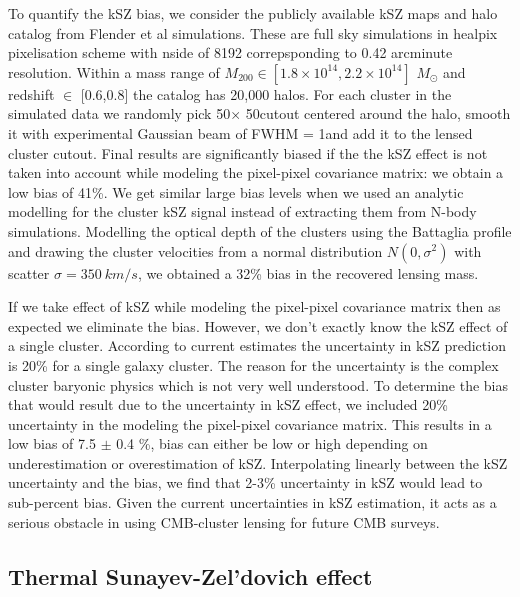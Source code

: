 To quantify the kSZ bias, we consider the publicly available kSZ maps and halo catalog from Flender et al simulations.
These are full sky simulations in healpix pixelisation scheme with nside of 8192 correpsponding to 0.42 arcminute resolution.
Within a mass range of $M_{200} \in [1.8 \times 10^{14},2.2 \times 10^{14}]$ $M_{\odot}$ and redshift $\in$ [0.6,0.8] the catalog has 20,000 halos. 
For each cluster in the simulated data we randomly pick 50\am $\times$ 50\am cutout centered around the halo, smooth it with experimental Gaussian beam of FWHM = 1\am and add it to the lensed cluster cutout. 
Final results are significantly biased if the the kSZ effect is not taken into account while modeling the pixel-pixel covariance matrix: we obtain a low bias of 41\%.
We get similar large bias levels when we used an analytic modelling for the cluster kSZ signal instead of extracting them from N-body simulations. Modelling the optical depth of the clusters using the Battaglia \cite{nickb2016} profile and drawing the cluster velocities from a normal distribution $N(0, \sigma^{2})$ with scatter $\sigma = 350\ km/s$, we obtained a 32\% bias in the recovered lensing mass.
  
 If we take effect of kSZ while modeling the pixel-pixel covariance matrix then as expected we eliminate the bias. 
 However, we don't exactly know the kSZ effect of a single cluster. According to current estimates the uncertainty in kSZ prediction is 20\% for a single galaxy cluster. 
 The reason for the uncertainty is the complex cluster baryonic physics which is not very well understood. 
 To determine the bias that would result due to the uncertainty in kSZ effect, we included 20\% uncertainty in the modeling the pixel-pixel covariance matrix. 
 This results in a low bias of 7.5 $\pm $ 0.4 \%, bias can either be low or high depending on underestimation or overestimation of kSZ.
 Interpolating linearly between the kSZ uncertainty and the bias, we find that 2-3\% uncertainty in kSZ would lead to sub-percent bias. 
 Given the current uncertainties in kSZ estimation, it acts as a serious obstacle in using CMB-cluster lensing for future CMB surveys. 
 
 \subsection{Thermal Sunayev-Zel'dovich effect}
 
